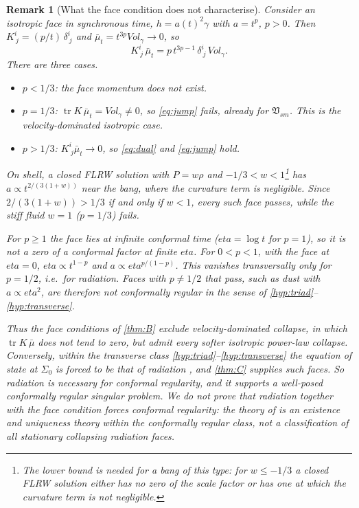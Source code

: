 \documentclass[11pt]{article}
\theoremstyle{canonmath}
\newtheorem{remark}[theorem]{Remark}
\theoremstyle{canonpostulate}
\theoremstyle{canonproposition}
\theoremstyle{canonmath}
\theoremstyle{canonproposition}
\providecommand{\Vsm}{\mathfrak{V}_{\mathrm{sm}}}
\def\mathrm#1{#1}%
\def\eta{eta}%
\begin{document}
\begin{remark}[What the face condition does not characterise]\label{rem:powerlaw}
Consider an isotropic face in synchronous time, $h = a(t)^2\gamma$ with $a = t^p$, $p>0$. Then $K^i_{\ j} = (p/t)\,\delta^i_{\ j}$ and $\bar\mu_t = t^{3p}\mathrm{Vol}_\gamma\to0$, so
\begin{equation}
K^i_{\ j}\,\bar\mu_t = p\,t^{3p-1}\,\delta^i_{\ j}\,\mathrm{Vol}_\gamma .
\label{eq:powerlaw}
\end{equation}
There are three cases.
\begin{itemize}
\item $p<1/3$: the face momentum does not exist.
\item $p=1/3$: $\operatorname{tr}K\,\bar\mu_t = \mathrm{Vol}_\gamma\neq0$, so \eqref{eq:jump} fails, already for $\Vsm$. This is the velocity-dominated isotropic case.
\item $p>1/3$: $K^i_{\ j}\bar\mu_t\to0$, so \eqref{eq:dual} and \eqref{eq:jump} hold.
\end{itemize}
On shell, a closed FLRW solution with $P = w\rho$ and $-1/3<w<1$\footnote{The lower bound is needed for a bang of this type: for $w\le-1/3$ a closed FLRW solution either has no zero of the scale factor or has one at which the curvature term is not negligible.} has $a\propto t^{2/(3(1+w))}$ near the bang, where the curvature term is negligible. Since $2/(3(1+w))>1/3$ if and only if $w<1$, every such face passes, while the stiff fluid $w=1$ ($p=1/3$) fails.

For $p\ge1$ the face lies at infinite conformal time ($\eta = \log t$ for $p = 1$), so it is not a zero of a conformal factor at finite $\eta$. For $0<p<1$, with the face at $\eta = 0$, $\eta\propto t^{1-p}$ and $a\propto\eta^{p/(1-p)}$. This vanishes transversally only for $p = 1/2$, i.e.\ for radiation. Faces with $p\neq1/2$ that pass, such as dust with $a\propto\eta^2$, are therefore not conformally regular in the sense of \ref{hyp:triad}--\ref{hyp:transverse}.

Thus the face conditions of \cref{thm:B} exclude velocity-dominated collapse, in which $\operatorname{tr}K\,\bar\mu$ does not tend to zero, but admit every softer isotropic power-law collapse. Conversely, within the transverse class \ref{hyp:triad}--\ref{hyp:transverse} the equation of state at $\Sigma_0$ is forced to be that of radiation \cite{Newman1993a,AnguigeTod1999a}, and \cref{thm:C} supplies such faces. So radiation is necessary for conformal regularity, and it supports a well-posed conformally regular singular problem. We do not prove that radiation together with the face condition forces conformal regularity: the theory of \cite{AnguigeTod1999a} is an existence and uniqueness theory within the conformally regular class, not a classification of all stationary collapsing radiation faces.
\end{remark}
\end{document}
